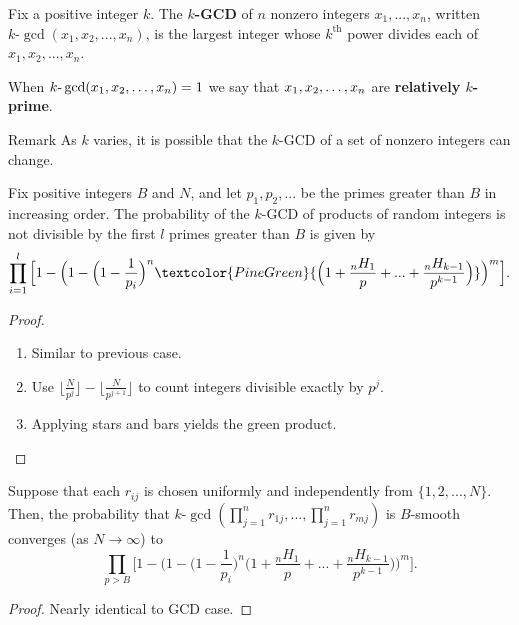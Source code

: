 \documentclass[11pt,xcolor={dvipsnames}]{beamer}
\begin{document}
	\begin{frame}
		\begin{definition} Fix a positive integer $k$. The \textbf{$k$-GCD} of $n$ nonzero integers $x_1, ..., x_n$, written $k\text{-}\gcd(x_1,x_2, ...,x_n)$, is the largest integer whose $k^{\text{th}}$ power divides each of $x_1, x_2, ..., x_n$.
		\end{definition}	
	
		\begin{definition} When $k\text{-}\gcd(x_1,x_2,\mathellipsis,x_n)=1$ we say that  $x_1,x_2,\mathellipsis,x_n$ are \textbf{relatively $k$-prime}.
		\end{definition}
		
		\begin{alertblock}{Remark}
			As $k$ varies, it is possible that the $k$-GCD of a set of nonzero integers can change. 
		\end{alertblock}

	\end{frame}

	\begin{frame}
		\begin{theorem}
			Fix positive integers $B$ and $N$, and let $p_1, p_2, ...$ be the primes greater than $B$ in increasing order. The probability of the $k$-GCD of products of random integers is not divisible by the first $l$ primes greater than $B$ is given by 
			$$\prod_{i=1}^{l} \Big[1 - \Big(1 - \Big(1-\frac{1}{p_i}\Big)^n \textcolor{PineGreen}{\Big(1 + \frac{{}_nH_1}{p} + ... + \frac{{}_nH_{k-1}}{p^{k-1}}\Big)}\Big)^m\Big].$$
		\end{theorem}
	
		\begin{proof}
			\begin{enumerate}
				\item Similar to previous case.
				\item Use
				$\Big\lfloor\frac{N}{p^j}\Big\rfloor - \Big\lfloor\frac{N}{p^{j+1}}\Big\rfloor$ to count integers divisible exactly by $p^j$.
				\item Applying stars and bars yields the \textcolor{PineGreen}{green product}.
			\end{enumerate}
		\end{proof}
	\end{frame}

	\begin{frame}
		\begin{theorem} Suppose that each $r_{ij}$ is chosen uniformly and independently from $\{1, 2, ..., N\}$. Then, the probability that $k\text{-}\gcd(\prod_{j=1}^n r_{1j}, ... , \prod_{j=1}^n r_{mj})$ is $B$-smooth converges (as $N \to \infty$) to
			$$\prod_{p>B} \Big[1 - \Big(1 - \Big(1-\frac{1}{p_i}\Big)^n \Big(1 + \frac{{}_nH_1}{p} + ... + \frac{{}_nH_{k-1}}{p^{k-1}}\Big)\Big)^m\Big].$$
		\end{theorem}
	
		\begin{proof}
			Nearly identical to GCD case.
		\end{proof}
	\end{frame}
\end{document}
